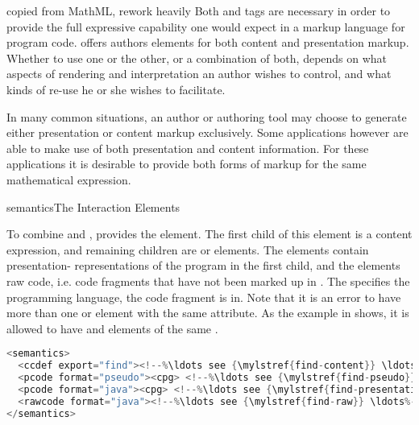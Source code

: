 \begin{newpart}{copied from MathML, rework heavily}
Both {} and {} tags are necessary in
order to provide the full expressive capability one would expect in a markup
language for program code.  {\codeml} offers authors elements for both content and
presentation markup.  Whether to use one or the other, or a combination of both,
depends on what aspects of rendering and interpretation an author wishes to
control, and what kinds of re-use he or she wishes to facilitate.
\end{newpart}

In many common situations, an author or authoring tool may choose to generate
either presentation or content markup exclusively. Some applications however are
able to make use of both presentation and content information. For these
applications it is desirable to provide both forms of markup for the same
mathematical expression.

\begin{myfig}{semantics}{The {\codeml} Interaction Elements}
  \quicktable{\semtable{}}
\end{myfig}

To combine {} and
{}, {\codeml} provides the
{} element. The first child of this element is a content
{\codeml} expression, and remaining children are {} or
{} elements. The {} elements contain
presentation-{\codeml} representations of the program in the first child, and the
{} elements raw code, i.e.  code fragments that have not been
marked up in {\codeml}. The {} specifies the
programming language, the code fragment is in. Note that it is an error to have
more than one {} or {} element with the same
{} attribute. As the example in
{} shows, it is allowed to have {} and
{} elements of the same {}.

\begin{lstlisting}[float,frame=lines,label=lst:find-combined,
   language=java,numbers=none,escapechar=\%,
   caption={Conbining markup Styles},
   index={find}]
<semantics>
  <ccdef export="find"><!--%\ldots see {\mylstref{find-content}} \ldots%--></ccdef>
  <pcode format="pseudo"><cpg> <!--%\ldots see {\mylstref{find-pseudo}} \ldots%--></cpg></pcode>
  <pcode format="java"><cpg> <!--%\ldots see {\mylstref{find-presentation}} \ldots%--></cpg></pcode>
  <rawcode format="java"><!--%\ldots see {\mylstref{find-raw}} \ldots%--></rawcode>
</semantics>   
\end{lstlisting}

